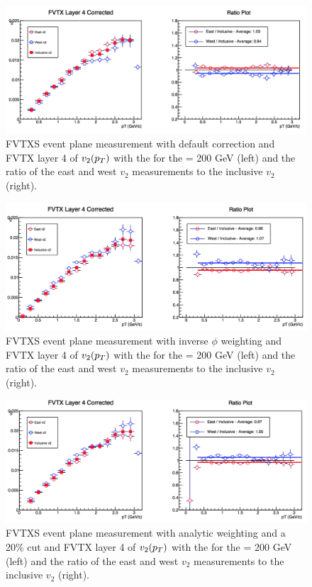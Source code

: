 \begin{figure}

\includegraphics[width=0.65\linewidth]{figs/fvtx_4_default.png}
\caption{FVTXS event plane measurement with default correction and FVTX layer 4 of $v_{2}(\mbox{$p_T$})$ with the  for the \pau \sqsn = 200 GeV (left) and the ratio of the east and west $v_2$ measurements to the inclusive $v_2$ (right).}
\end{figure}

\begin{figure}

\includegraphics[width=0.65\linewidth]{figs/fvtx_4_data.png}
\caption{FVTXS event plane measurement with inverse $\phi$ weighting and FVTX layer 4 of $v_{2}(\mbox{$p_T$})$ with the  for the \pau \sqsn = 200 GeV (left) and the ratio of the east and west $v_2$ measurements to the inclusive $v_2$ (right).}
\end{figure}

\begin{figure}

\includegraphics[width=0.65\linewidth]{figs/fvtx_4_analytic.png}
\caption{FVTXS event plane measurement with analytic weighting and a 20\% cut and FVTX layer 4 of $v_{2}(\mbox{$p_T$})$ with the  for the \pau \sqsn = 200 GeV (left) and the ratio of the east and west $v_2$ measurements to the inclusive $v_2$ (right).}
\end{figure}

